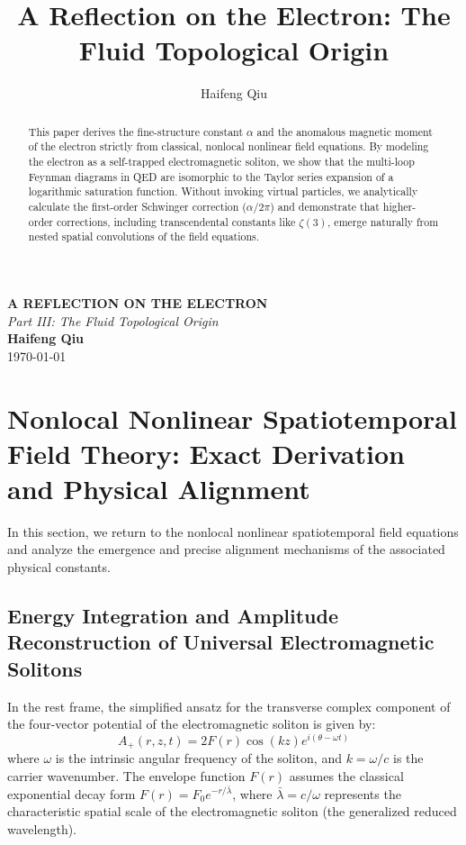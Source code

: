 \documentclass[12pt, a4paper]{article}
\title{A Reflection on the Electron: The Fluid Topological Origin}
\author{Haifeng Qiu}
\begin{document}
\begin{center}
    {\uppercase{\Large \textbf{A Reflection on the Electron}}} \\
    \vspace{0.5em}
    {\large \textit{Part III: The Fluid Topological Origin}} \\
    \vspace{2em}
    \textbf{Haifeng Qiu} \\
    \today
    \vspace{2em}
\end{center}



\begin{abstract}
This paper derives the fine-structure constant $\alpha$ and the anomalous magnetic moment of the electron strictly from classical, nonlocal nonlinear field equations. By modeling the electron as a self-trapped electromagnetic soliton, we show that the multi-loop Feynman diagrams in QED are isomorphic to the Taylor series expansion of a logarithmic saturation function. Without invoking virtual particles, we analytically calculate the first-order Schwinger correction ($\alpha/2\pi$) and demonstrate that higher-order corrections, including transcendental constants like $\zeta(3)$, emerge naturally from nested spatial convolutions of the field equations.
\end{abstract}

\vspace{2em}

\section{Nonlocal Nonlinear Spatiotemporal Field Theory: Exact Derivation and Physical Alignment}

In this section, we return to the nonlocal nonlinear spatiotemporal field equations and analyze the emergence and precise alignment mechanisms of the associated physical constants.

\subsection{Energy Integration and Amplitude Reconstruction of Universal Electromagnetic Solitons}

In the rest frame, the simplified ansatz for the transverse complex component of the four-vector potential of the electromagnetic soliton is given by:
\begin{equation}
A_+(r, z, t) = 2 F(r) \cos(kz) e^{i(\theta - \omega t)}
\end{equation}
where $\omega$ is the intrinsic angular frequency of the soliton, and $k = \omega/c$ is the carrier wavenumber. The envelope function $F(r)$ assumes the classical exponential decay form $F(r) = F_0 e^{-r/\bar{\lambda}}$, where $\bar{\lambda} = c/\omega$ represents the characteristic spatial scale of the electromagnetic soliton (the generalized reduced wavelength).
\end{document}
